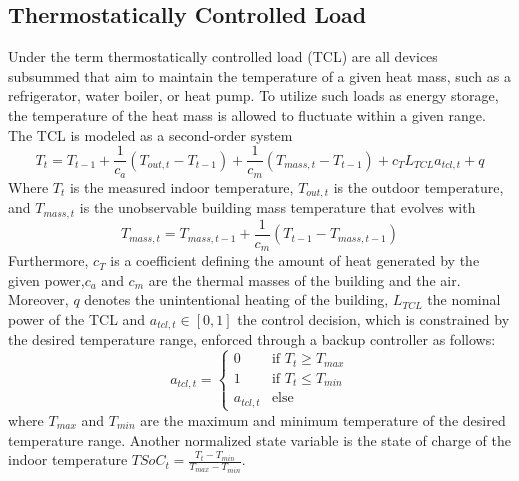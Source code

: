 \documentclass{article}
\theoremstyle{plain}
\theoremstyle{definition}
\theoremstyle{remark}
\begin{document}
\subsection{Thermostatically Controlled Load}
Under the term thermostatically controlled load (TCL) are all devices subsummed that aim to maintain the temperature of a given heat mass, such as a refrigerator, water boiler, or heat pump. To utilize such loads as energy storage, the temperature of the heat mass is allowed to fluctuate within a given range. The TCL is modeled as a second-order system
    \begin{equation}
        T_t = T_{t-1} + \frac{1}{c_a} (T_{out, t} - T_{t-1}) + \frac{1}{c_m} (T_{mass,t} - T_{t-1}) + c_{T} L_{TCL} a_{tcl,t} + q
    \end{equation}
    Where $T_t$ is the measured indoor temperature, $T_{out, t}$ is the outdoor temperature, and $T_{mass,t}$ is the unobservable building mass temperature that evolves with
    \begin{equation}
        T_{mass, t} = T_{mass, t-1} + \frac{1}{c_m} (T_{t-1} - T_{mass, t-1})
    \end{equation}
    Furthermore, $c_T$ is a coefficient defining the amount of heat generated by the given power,$c_a$ and $c_m$ are the thermal masses of the building and the air. Moreover, $q$ denotes the unintentional heating of the building, $L_{TCL}$ the nominal power of the TCL and $a_{tcl, t} \in [0, 1]$ the control decision, which is constrained by the desired temperature range, enforced through a backup controller as follows:
    \begin{equation}
        a_{tcl, t} = \begin{cases}
            0 & \text{if } T_t \geq T_{max} \\
            1 & \text{if } T_t \leq T_{min} \\
            a_{tcl, t} & \text{else} 
        \end{cases}
    \end{equation}
    where $T_{max}$ and $T_{min}$ are the maximum and minimum temperature of the desired temperature range. Another normalized state variable is the state of charge of the indoor temperature $TSoC_t = \frac{T_t - T_{min}}{T_{max} - T_{min}}$.
\end{document}
